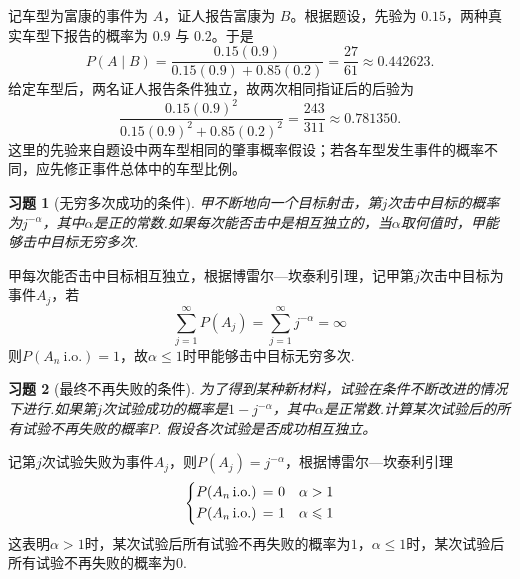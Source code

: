 \documentclass[12pt,fontset=fandol]{ctexart}
\newtheorem{exercise}{习题}[section]
\begin{document}
\begin{solve}\label{a:Y2.25}记车型为富康的事件为 $A$，证人报告富康为 $B$。根据题设，先验为 $0.15$，两种真实车型下报告的概率为 $0.9$ 与 $0.2$。于是\[P(A\mid B)=\frac{0.15(0.9)}{0.15(0.9)+0.85(0.2)}=\frac{27}{61}\approx0.442623.\]给定车型后，两名证人报告条件独立，故两次相同指证后的后验为\[\frac{0.15(0.9)^2}{0.15(0.9)^2+0.85(0.2)^2}=\frac{243}{311}\approx0.781350.\]这里的先验来自题设中两车型相同的肇事概率假设；若各车型发生事件的概率不同，应先修正事件总体中的车型比例。\end{solve}

\begin{exercise}[无穷多次成功的条件]\label{q:Y2.26}
甲不断地向一个目标射击，第$j$次击中目标的概率为$j^{-\alpha}$，其中$\alpha$是正的常数.如果每次能否击中是相互独立的，当$\alpha$取何值时，甲能够击中目标无穷多次.\par{}
\end{exercise}

\begin{solve}\label{a:Y2.26}
甲每次能否击中目标相互独立，根据博雷尔—坎泰利引理，记甲第$j$次击中目标为事件$A_j$，若
\[\sum\limits_{j = 1}^\infty  {P({A_j})}  = \sum\limits_{j = 1}^\infty  {{j^{ - \alpha }}}  = \infty \]
则$P(A_n\: \text{i.o.})=1$，故$\alpha\leqslant 1$时甲能够击中目标无穷多次.
\end{solve}

\begin{exercise}[最终不再失败的条件]\label{q:Y2.27}
为了得到某种新材料，试验在条件不断改进的情况下进行.如果第$j$次试验成功的概率是$1-j^{-\alpha}$，其中$\alpha$是正常数.计算某次试验后的所有试验不再失败的概率$P$. 假设各次试验是否成功相互独立。\par{}
\end{exercise}

\begin{solve}\label{a:Y2.27}
记第$j$次试验失败为事件$A_j$，则$P(A_j)=j^{-\alpha}$，根据博雷尔—坎泰利引理
\[\left\{ \begin{gathered}
  P({A_n}\,{\text{i}}.{\text{o}}{\text{.) = 0}} \hfill \quad \alpha>1 \\
  P({A_n}\,{\text{i}}.{\text{o}}{\text{.) = 1}} \hfill \quad \alpha\leqslant 1\\ 
\end{gathered}  \right.\]
这表明$\alpha>1$时，某次试验后所有试验不再失败的概率为$1$，$\alpha\leqslant 1$时，某次试验后所有试验不再失败的概率为$0$.
\end{solve}
\end{document}
